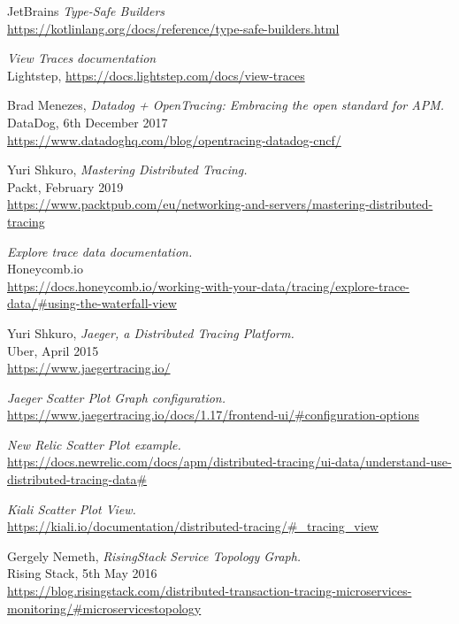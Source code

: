 \documentclass[12pt,pdftex,titlepage]{report}
\begin{document}
\begin{thebibliography}{69}
        JetBrains \textit{Type-Safe Builders} \\
        \url{https://kotlinlang.org/docs/reference/type-safe-builders.html}

        \textit{View Traces documentation} \\
        Lightstep, \url{https://docs.lightstep.com/docs/view-traces}

        Brad Menezes, \textit{Datadog + OpenTracing: Embracing the open standard for APM.} \\
        DataDog, 6th December 2017 \\
        \url{https://www.datadoghq.com/blog/opentracing-datadog-cncf/}

        Yuri Shkuro, \textit{Mastering Distributed Tracing.} \\
        Packt, February 2019 \\
        \url{https://www.packtpub.com/eu/networking-and-servers/mastering-distributed-tracing}

        \textit{Explore trace data documentation.} \\
        Honeycomb.io \\
        \url{https://docs.honeycomb.io/working-with-your-data/tracing/explore-trace-data/#using-the-waterfall-view}

        Yuri Shkuro, \textit{Jaeger, a Distributed Tracing Platform.} \\
        Uber, April 2015 \\
        \url{https://www.jaegertracing.io/}

        \textit{Jaeger Scatter Plot Graph configuration.} \\
        \url{https://www.jaegertracing.io/docs/1.17/frontend-ui/#configuration-options}

        \textit{New Relic Scatter Plot example.} \\
        \url{https://docs.newrelic.com/docs/apm/distributed-tracing/ui-data/understand-use-distributed-tracing-data#}

        \textit{Kiali Scatter Plot View.} \\
        \url{https://kiali.io/documentation/distributed-tracing/#_tracing_view}

        Gergely Nemeth, \textit{RisingStack Service Topology Graph.} \\
        Rising Stack, 5th May 2016 \\
        \url{https://blog.risingstack.com/distributed-transaction-tracing-microservices-monitoring/#microservicestopology}


\end{thebibliography}
\end{document}
